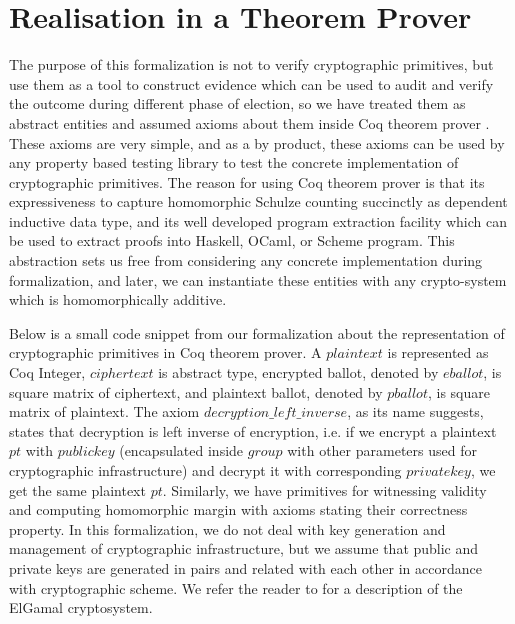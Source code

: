 \documentclass{llncs}
\begin{document}
\section{Realisation in a Theorem Prover}

The purpose of this formalization is not to verify cryptographic primitives, 
but use them as a tool to construct evidence which can be used 
to audit and verify the outcome during different phase 
of election, so we have treated them as abstract entities and assumed 
axioms about them inside Coq theorem prover \cite{Bertot:2004:ITP}.
These axioms are very simple, and as a by product, these axioms can 
be used by any property based testing library to test the concrete
implementation of cryptographic primitives. The reason for using Coq 
theorem prover is that its expressiveness to capture homomorphic 
Schulze counting succinctly as dependent inductive data type, and 
its well developed program extraction \cite{Letouzey:2003:NEC} facility 
which can be used to extract proofs into Haskell, OCaml, or Scheme program.  
This abstraction sets us free from considering any concrete implementation 
during formalization, and later, we can 
instantiate these entities with any crypto-system which is homomorphically 
additive. 

 Below is a small code snippet from our formalization
about the representation of cryptographic primitives in Coq theorem prover.
A $plaintext$ is represented as Coq Integer, $ciphertext$ is abstract type, 
encrypted ballot, denoted by $eballot$,  is square matrix of ciphertext, and
plaintext ballot, denoted by $pballot$,  is square matrix of plaintext.
The axiom  $decryption\_left\_inverse$, as its name suggests, states 
that decryption  is left inverse of encryption, i.e.  
if we encrypt a plaintext $pt$ with $publickey$ 
(encapsulated inside $group$ with other parameters 
used for cryptographic infrastructure) and decrypt it with corresponding 
$privatekey$, we get the same plaintext $pt$. Similarly, we have 
primitives for witnessing validity and computing homomorphic margin with
axioms stating their correctness property.
In this formalization, we do not deal with key generation and management of
cryptographic infrastructure, but we assume that public and private keys 
are generated 
in pairs and related with each other in accordance with cryptographic scheme. 
We refer the reader to \cite{DBLP:conf/crypto/Gamal84} for a description
of the ElGamal cryptosystem.
   
\end{document}
